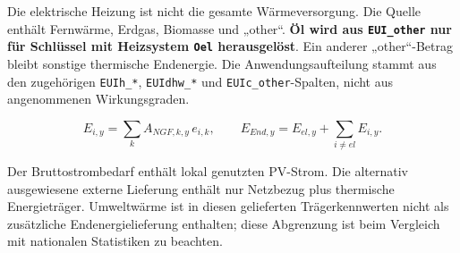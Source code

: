 \documentclass[
  ngerman,
  a4paper,
  DIV=11]{scrreprt}
\begin{document}
Die elektrische Heizung ist nicht die gesamte Wärmeversorgung. Die
Quelle enthält Fernwärme, Erdgas, Biomasse und „other``. \textbf{Öl wird
aus \texttt{EUI\_other} nur für Schlüssel mit Heizsystem \texttt{Oel}
herausgelöst}. Ein anderer „other``-Betrag bleibt sonstige thermische
Endenergie. Die Anwendungsaufteilung stammt aus den zugehörigen
\texttt{EUIh\_*}, \texttt{EUIdhw\_*} und \texttt{EUIc\_other}-Spalten,
nicht aus angenommenen Wirkungsgraden.

\[E_{i,y}=\sum_k A_{NGF,k,y}\,e_{i,k},\qquad E_{End,y}=E_{el,y}+\sum_{i\ne el}E_{i,y}.\]

Der Bruttostrombedarf enthält lokal genutzten PV-Strom. Die alternativ
ausgewiesene externe Lieferung enthält nur Netzbezug plus thermische
Energieträger. Umweltwärme ist in diesen gelieferten Trägerkennwerten
nicht als zusätzliche Endenergielieferung enthalten; diese Abgrenzung
ist beim Vergleich mit nationalen Statistiken zu beachten.
\end{document}
